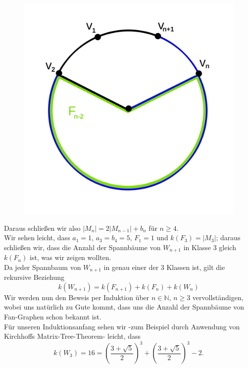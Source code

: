 \begin{figure}[H]
\begin{minipage}{0.45\textwidth}
        \includegraphics[width=1\textwidth]{mn3.png}
        \caption{}
 \label{mn3} %
    \end{minipage}
\end{figure}
Daraus schließen wir also $|M_{n}|=2|M_{n-1}|+b_{n}$ für $n\geq4$.\\
Wir sehen leicht, dass $a_1=1$, $a_3=b_4=5$, $F_1=1$ und $\mathit{k}\left(F_3\right)=|M_3|$; daraus schließen wir, dass die Anzahl der Spannbäume von $W_{n+1}$ in Klasse 3 gleich $\mathit{k}\left(F_{n}\right)$ ist, was wir zeigen wollten.\\
Da jeder Spannbaum von $W_{n+1}$ in genau einer der 3 Klassen ist, gilt die rekursive Beziehung
\begin{equation}
\mathit{k}\left(W_{n+1}\right) = \mathit{k}\left(F_{n+1}\right) + \mathit{k}\left(F_n\right) + \mathit{k}\left(W_n\right)
\label{eq:wrek}
\end{equation}
Wir werden nun den Beweis per Induktion über $n \in \mathbb{N}, \, n \geq 3$ vervollständigen, wobei uns natürlich zu Gute kommt, dass uns die Anzahl der Spannbäume von Fan-Graphen schon bekannt ist.\\
Für unseren Induktionsanfang sehen wir -zum Beispiel durch Anwendung von Kirchhoffs Matrix-Tree-Theorem- leicht, dass \begin{equation}
\mathit{k}\left(W_3\right) = 16 = \left(\frac{3+\sqrt{5}}{2}\right)^3+\left(\frac{3+\sqrt{5}}{2}\right)^3-2.
\end{equation}
